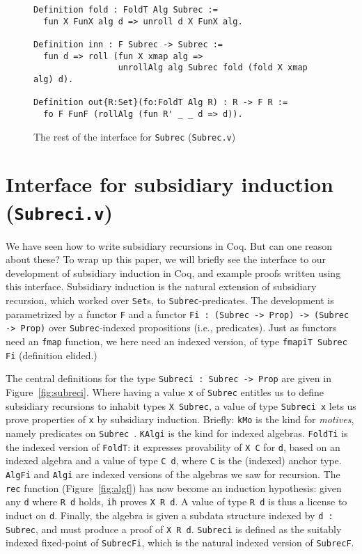 \documentclass[a4paper,USenglish]{lipics-v2021}
\begin{document}
\begin{figure}
\begin{verbatim}
Definition fold : FoldT Alg Subrec := 
  fun X FunX alg d => unroll d X FunX alg.

Definition inn : F Subrec -> Subrec :=
  fun d => roll (fun X xmap alg =>
                 unrollAlg alg Subrec fold (fold X xmap alg) d).

Definition out{R:Set}(fo:FoldT Alg R) : R -> F R :=
  fo F FunF (rollAlg (fun R' _ _ d => d)).
\end{verbatim}
\caption{The rest of the interface for \texttt{Subrec} (\texttt{Subrec.v})}
\label{fig:subrecb}
\end{figure}


\section{Interface for subsidiary induction (\texttt{Subreci.v})}
\label{sec:interfacei}

We have seen how to write subsidiary recursions in Coq.  But can one
reason about these?  To wrap up this paper, we will briefly see the
interface to our development of subsidiary induction in Coq, and
example proofs written using this interface.  Subsidiary induction is
the natural extension of subsidiary recursion, which worked over
\verb|Set|s, to \verb|Subrec|-predicates.  The development is
parametrized by a functor \verb|F| and a functor
\verb|Fi : (Subrec -> Prop) -> (Subrec -> Prop)| over
\verb|Subrec|-indexed propositions (i.e., predicates).  Just as
functors need an \verb|fmap| function, we here need an indexed
version, of type \verb|fmapiT Subrec Fi| (definition elided.)

The central definitions for the type \verb|Subreci : Subrec -> Prop|
are given in Figure~\ref{fig:subreci}.  Where having a value \verb|x|
of \verb|Subrec| entitles us to define subsidiary recursions to
inhabit types \verb|X Subrec|, a value of type \verb|Subreci x| lets
us prove properties of \verb|x| by subsidiary induction.  Briefly:
\verb|kMo| is the kind for \emph{motives}, namely predicates on
\verb|Subrec|~\cite{mcbride00}.  \verb|KAlgi| is the kind for indexed
algebras.  \verb|FoldTi| is the indexed version of \verb|FoldT|: it 
expresses provability of \verb|X C| for \verb|d|, based on an indexed
algebra and a value of type \verb|C d|, where \verb|C| is the (indexed) anchor
type.  \verb|AlgFi| and \verb|Algi| are indexed versions
of the algebras we saw for recursion.  The \verb|rec| function
(Figure~\ref{fig:algf}) has now become an induction hypothesis: given
any \verb|d| where \verb|R d| holds, \verb|ih| proves \verb|X R d|.  A
value of type \verb|R d| is thus a license to induct on \verb|d|.
Finally, the algebra is given a subdata structure indexed by
\verb|d : Subrec|, and must produce a proof of \verb|X R d|.  \verb|Subreci|
is defined as the suitably indexed fixed-point of \verb|SubrecFi|, which
is the natural indexed version of \verb|SubrecF|.
\end{document}

